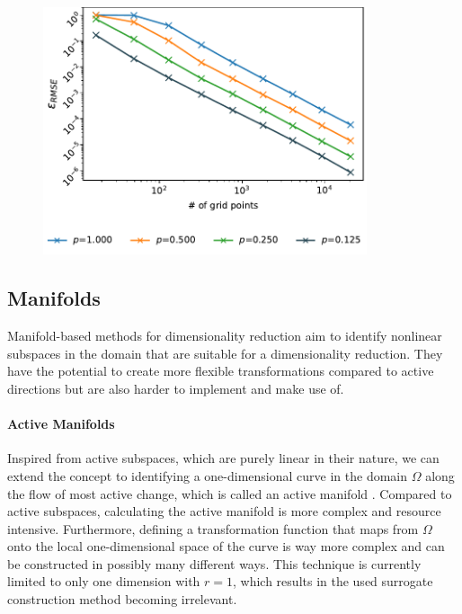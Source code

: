 \documentclass[
  a4paper,  %
  twoside,  %
  bibliography=totoc,
  headsepline,
  cleardoublepage=empty,
  parskip=half,
  draft=false
]{scrbook}
\begin{document}
\begin{mdframed}[style=style]
\vspace{2mm}
\begin{figure}[H]
        \centering
\begin{minipage}{.35\textwidth}
        \centering
\label{fig:periodic}
    \end{minipage}%
    \begin{minipage}{0.65\textwidth}
        \centering
\includegraphics[width=0.85\textwidth]{graphics/periodic}
    \end{minipage}
\end{figure}
\end{mdframed}

\subsection{Manifolds}

Manifold-based methods for dimensionality reduction aim to identify nonlinear subspaces in the domain that are suitable for a dimensionality reduction.
They have the potential to create more flexible transformations compared to active directions but are also harder to implement and make use of.

\paragraph{Active Manifolds}
Inspired from active subspaces, which are purely linear in their nature, we can extend the concept to identifying a one-dimensional curve in the domain $\Omega$ along the flow of most active change, which is called an active manifold \cite{Bridges2019}.
Compared to active subspaces, calculating the active manifold is more complex and resource intensive.
Furthermore, defining a transformation function that maps from $\Omega$ onto the local one-dimensional space of the curve is way more complex and can be constructed in possibly many different ways.
This technique is currently limited to only one dimension with $r=1$, which results in the used surrogate construction method becoming irrelevant.
\end{document}
